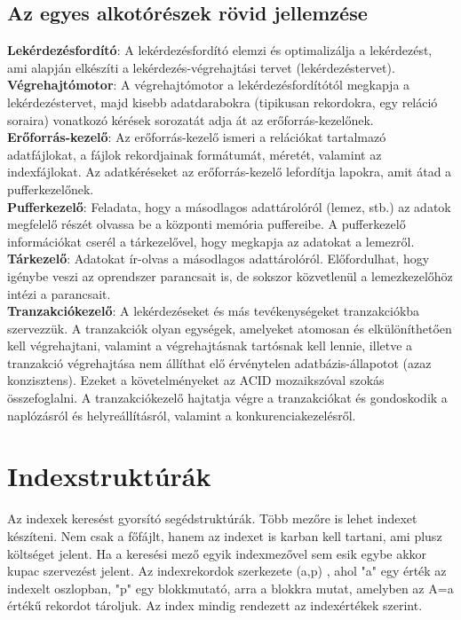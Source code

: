 \documentclass[margin=0px]{article}
\begin{document}
\subsection{Az egyes alkotórészek rövid jellemzése}
\noindent \textbf{Lekérdezésfordító}: A lekérdezésfordító elemzi és optimalizálja a lekérdezést, ami alapján
elkészíti a lekérdezés-végrehajtási tervet (lekérdezéstervet).\\

\noindent \textbf{Végrehajtómotor}: A végrehajtómotor a lekérdezésfordítótól megkapja a lekérdezéstervet, majd kisebb
adatdarabokra (tipikusan rekordokra, egy reláció soraira) vonatkozó kérések sorozatát adja át az erőforrás-kezelőnek.\\

\noindent \textbf{Erőforrás-kezelő}: Az erőforrás-kezelő ismeri a relációkat tartalmazó adatfájlokat, a fájlok
rekordjainak formátumát, méretét, valamint az indexfájlokat. Az adatkéréseket az erőforrás-kezelő lefordítja lapokra,
amit átad a pufferkezelőnek.\\

\noindent \textbf{Pufferkezelő}: Feladata, hogy a másodlagos adattárolóról (lemez, stb.) az adatok megfelelő részét olvassa
be a központi memória puffereibe. A pufferkezelő információkat cserél a tárkezelővel, hogy megkapja az adatokat
a lemezről.\\

\noindent \textbf{Tárkezelő}: Adatokat ír-olvas a másodlagos adattárolóról. Előfordulhat, hogy igénybe veszi az oprendszer
parancsait is, de sokszor közvetlenül a lemezkezelőhöz intézi a parancsait.\\

\noindent \textbf{Tranzakciókezelő}: A lekérdezéseket és más tevékenységeket tranzakciókba szervezzük. A tranzakciók olyan
egységek, amelyeket atomosan és elkülöníthetően kell végrehajtani, valamint a végrehajtásnak tartósnak kell lennie, illetve
a tranzakció végrehajtása nem állíthat elő érvénytelen adatbázis-állapotot (azaz konzisztens). Ezeket a követelményeket
az ACID mozaikszóval szokás összefoglalni. A tranzakciókezelő hajtatja végre a tranzakciókat és gondoskodik a naplózásról
és helyreállításról, valamint a konkurenciakezelésről.\\

\section{Indexstruktúrák}

Az indexek keresést gyorsító segédstruktúrák. Több mezőre is lehet indexet készíteni. Nem csak a
főfájlt, hanem az indexet is karban kell tartani, ami plusz költséget jelent. Ha a keresési mező egyik
indexmezővel sem esik egybe akkor kupac szervezést jelent. Az indexrekordok szerkezete (a,p) , ahol
"a" egy  érték  az  indexelt  oszlopban, "p" egy  blokkmutató, arra a  blokkra mutat, amelyben az A=a
értékű rekordot tároljuk. Az index mindig rendezett az indexértékek szerint.
\end{document}
